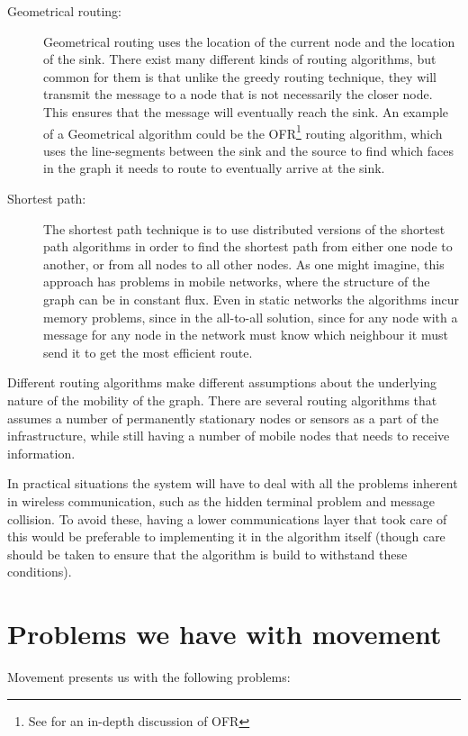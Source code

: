 \documentclass[letter, 12pt, english, draft]{article}
\begin{document}
\begin{description}
\item[Geometrical routing:] Geometrical routing uses the location of the current node and the location of the sink. There exist many different kinds of routing algorithms, but common for them is that unlike the greedy routing technique, they will transmit the message to a node that is not necessarily the closer node. This ensures that the message will eventually reach the sink. An example of a Geometrical algorithm could be the OFR\footnote{See \cite{gopher} for an in-depth discussion of OFR} routing algorithm, which uses the line-segments between the sink and the source to find which faces in the graph it needs to route to eventually arrive at the sink.

\item[Shortest path:] The shortest path technique is to use distributed versions of the shortest path algorithms in order to find the shortest path from either one node to another, or from all nodes to all other nodes. As one might imagine, this approach has problems in mobile networks, where the structure of the graph can be in constant flux. Even in static networks the algorithms incur memory problems, since in the all-to-all solution, since for any node with a message for any node in the network must know which neighbour it must send it to get the most efficient route.  
\end{description}

Different routing algorithms make different assumptions about the underlying nature of the mobility of the graph. There are several routing algorithms \cite{two-tier}\cite{adaptive} that assumes a number of permanently stationary nodes or sensors as a part of the infrastructure, while still having a number of mobile nodes that needs to receive information. 

In practical situations the system will have to deal with all the problems inherent in wireless communication, such as the hidden terminal problem and message collision. To avoid these, having a lower communications layer that took care of this would be preferable to implementing it in the algorithm itself (though care should be taken to ensure that the algorithm is build to withstand these conditions).

\section{Problems we have with movement}

Movement presents us with the following problems:
\end{document}

